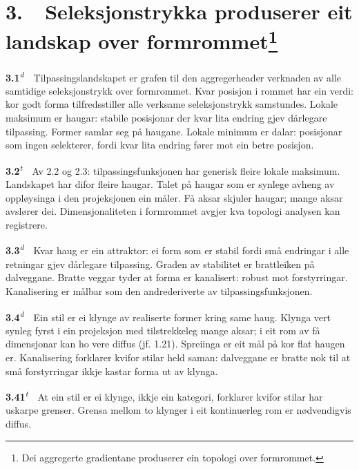 \documentclass[10pt]{article}
\begin{document}
\chapter*{3.~~Seleksjonstrykka produserer eit landskap over formrommet\footnote{Dei aggregerte gradientane produserer ein topologi over formrommet.}}




\noindent\textbf{3.1}\textsuperscript{\textit{d}}~~Tilpassingslandskapet er grafen til den aggregerheader verknaden av alle samtidige seleksjonstrykk over formrommet. Kvar posisjon i rommet har ein verdi: kor godt forma tilfredsstiller alle verksame seleksjonstrykk samstundes. Lokale maksimum er haugar: stabile posisjonar der kvar lita endring gjev dårlegare tilpassing. Former samlar seg på haugane. Lokale minimum er dalar: posisjonar som ingen selekterer, fordi kvar lita endring fører mot ein betre posisjon.




\noindent\textbf{3.2}\textsuperscript{\textit{t}}~~Av 2.2 og 2.3: tilpassingsfunksjonen har generisk fleire lokale maksimum. Landskapet har difor fleire haugar. Talet på haugar som er synlege avheng av oppløysinga i den projeksjonen ein måler. Få aksar skjuler haugar; mange aksar avslører dei. Dimensjonaliteten i formrommet avgjer kva topologi analysen kan registrere.




\noindent\textbf{3.3}\textsuperscript{\textit{d}}~~Kvar haug er ein attraktor: ei form som er stabil fordi små endringar i alle retningar gjev dårlegare tilpassing. Graden av stabilitet er brattleiken på dalveggane. Bratte veggar tyder at forma er kanalisert: robust mot forstyrringar. Kanalisering er målbar som den andrederiverte av tilpassingsfunksjonen.




\noindent\textbf{3.4}\textsuperscript{\textit{d}}~~Ein stil er ei klynge av realiserte former kring same haug. Klynga vert synleg fyrst i ein projeksjon med tilstrekkeleg mange aksar; i eit rom av få dimensjonar kan ho vere diffus (jf. 1.21). Spreiinga er eit mål på kor flat haugen er. Kanalisering forklarer kvifor stilar held saman: dalveggane er bratte nok til at små forstyrringar ikkje kastar forma ut av klynga.




\noindent\textbf{3.41}\textsuperscript{\textit{t}}~~At ein stil er ei klynge, ikkje ein kategori, forklarer kvifor stilar har uskarpe grenser. Grensa mellom to klynger i eit kontinuerleg rom er nødvendigvis diffus.
\end{document}
